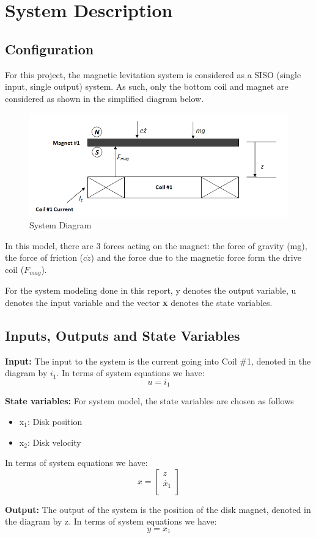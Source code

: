 \chapter{System Description} 


\section{Configuration}
%	

For this project, the magnetic levitation system is considered as a SISO (single input, single output) system.  As such, only the bottom coil and magnet are considered as shown in the simplified diagram below.

\begin{figure}[h]
    \centering
    \includegraphics[width=.9\textwidth]{projSys}
    \caption{System Diagram}
    \label{fig:projSys}
\end{figure}

In this model, there are 3 forces acting on the magnet: the force of gravity (mg), the force of friction ($c\dot{z}$) and the force due to the magnetic force form the drive coil ($F_{mag}$).

For the system modeling done in this report, y denotes the output variable, u denotes the input variable and the vector \textbf{x} denotes the state variables.

\section{Inputs, Outputs and State Variables}

\textbf{Input:} The input to the system is the current going into Coil \#1, denoted in the diagram by $i_{1}$.
In terms of system equations we have:
\begin{equation}
u = i_{1}
\end{equation}

\textbf{State variables:} For system model, the state variables are chosen as follows
\begin{itemize}
\item x$_1$:  Disk position
\item x$_2$:  Disk velocity
\end{itemize}
In terms of system equations we have:
\begin{equation}
x = 
\left[
\begin{array}{c}
z\\
\dot{x_{1}}\\
\end{array}
\right]
\end{equation}

\textbf{Output:} The output of the system is the position of the disk magnet, denoted in the diagram by z.
In terms of system equations we have:
\begin{equation}
y = x_{1}
\end{equation}